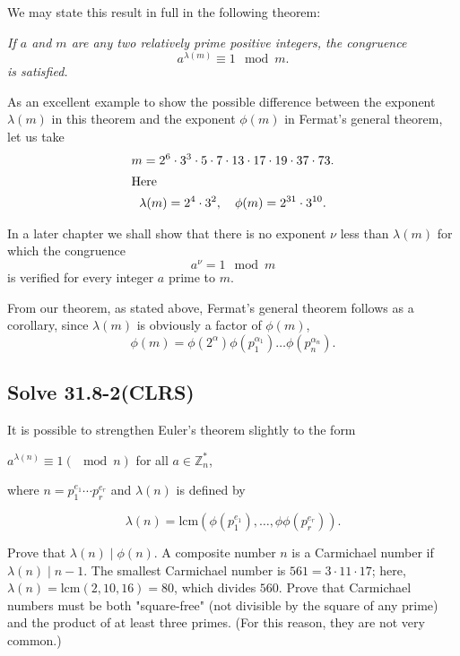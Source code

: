 We may state this result in full in the following theorem:

\smallskip \emph{If $a$ and $m$ are any two relatively prime positive
integers, the congruence}
\begin{equation*}
a^{\lambda(m)} \equiv 1 \mod m.
\end{equation*}
\emph{is satisfied.}

As an excellent example to show the possible difference between the
exponent $\lambda(m)$ in this theorem and the exponent $\phi(m)$ in
Fermat's general theorem, let us take
\begin{gather*}
m = 2^6 \cdot 3^3 \cdot 5 \cdot 7 \cdot 13 \cdot 17 \cdot 19
        \cdot 37 \cdot 73. \\
\intertext{Here}
\lambda(m) = 2^4 \cdot 3^2, \quad \phi(m) = 2^{31} \cdot 3^{10}.
\end{gather*}

In a later chapter we shall show that there is no exponent $\nu$
less than $\lambda(m)$ for which the congruence
\begin{equation*}
a^\nu = 1 \mod m
\end{equation*}
is verified for every integer $a$ prime to $m$.

From our theorem, as stated above, Fermat's general theorem follows
as a corollary, since $\lambda(m)$ is obviously a factor of
$\phi(m)$,
\begin{equation*}
\phi(m) = \phi(2^\alpha) \phi(p_1^{\alpha_1}) \ldots
               \phi(p_n^{\alpha_n}).
\end{equation*}


\subsection{Solve 31.8-2(CLRS)}
\begin{justbox}

    It is possible to strengthen Euler's theorem slightly to the form

    $a^{\lambda(n)} \equiv 1 (\mod n)$ for all $a \in \mathbb Z_n^*$,
    
    where $n = p_1^{e_1} \cdots p_r^{e_r}$ and $\lambda(n)$ is defined by
    
    $$\lambda(n) = \text{lcm}(\phi(p_1^{e_1}), \ldots, \phi\phi(p_r^{e_r})). $$
    
    Prove that $\lambda(n) \mid \phi(n)$. A composite number $n$ is a Carmichael number if $\lambda(n) \mid n - 1$. The smallest Carmichael number is $561 = 3 \cdot 11 \cdot 17$; here, $\lambda(n) = \text{lcm}(2, 10, 16) = 80$, which divides $560$. Prove that Carmichael numbers must be both "square-free" (not divisible by the square of any prime) and the product of at least three primes. (For this reason, they are not very common.)
        
\end{justbox}

